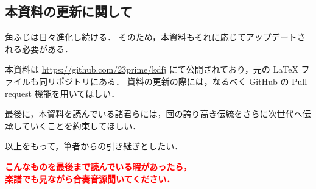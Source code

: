 \documentclass[uplatex]{jsarticle}
\begin{document}
  \subsection*{本資料の更新に関して}
  角ふじは日々進化し続ける．
  そのため，本資料もそれに応じてアップデートされる必要がある．

  本資料は \url{https://github.com/23prime/kdfj} にて公開されており，元の LaTeX ファイルも同リポジトリにある．
  資料の更新の際には，なるべく GitHub の Pull request 機能を用いてほしい．

  \vspace{6mm}
 最後に，本資料を読んでいる諸君らには，団の誇り高き伝統をさらに次世代へ伝承していくことを約束してほしい．

 以上をもって，筆者からの引き継ぎとしたい．

 \newpage

 \begin{center}
  {\bf {\huge {\textcolor{red}{
  こんなものを最後まで読んでいる暇があったら，\\楽譜でも見ながら合奏音源聞いてください．
  }}}}
 \end{center}
\end{document}
